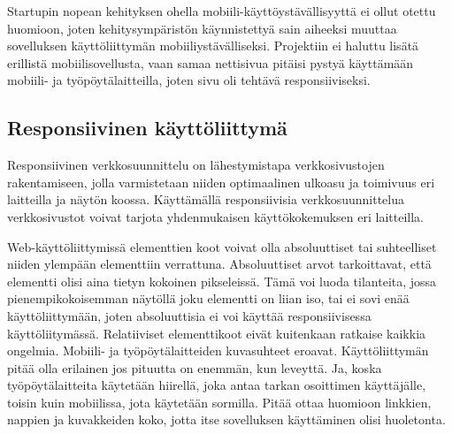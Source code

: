 

Startupin nopean kehityksen ohella mobiili-käyttöystävällisyyttä ei ollut otettu huomioon, 
joten kehitysympäristön käynnistettyä sain aiheeksi muuttaa sovelluksen käyttöliittymän mobiiliystävälliseksi.
Projektiin ei haluttu lisätä erillistä mobiilisovellusta, vaan samaa nettisivua pitäisi pystyä käyttämään mobiili- ja työpöytälaitteilla, joten sivu oli tehtävä responsiiviseksi.\medskip





\subsection*{Responsiivinen käyttöliittymä}




Responsiivinen verkkosuunnittelu on lähestymistapa verkkosivustojen rakentamiseen, jolla varmistetaan niiden optimaalinen ulkoasu ja toimivuus eri laitteilla ja näytön koossa.
Käyttämällä responsiivisia verkkosuunnittelua verkkosivustot voivat tarjota yhdenmukaisen käyttökokemuksen eri laitteilla.
\medskip


Web-käyttöliittymissä elementtien koot voivat olla absoluuttiset tai suhteelliset niiden ylempään elementtiin verrattuna. Absoluuttiset arvot tarkoittavat, että elementti olisi aina tietyn kokoinen pikseleissä. 
Tämä voi luoda tilanteita, jossa pienempikokoisemman näytöllä joku elementti on liian iso, tai ei sovi enää käyttöliittymään, joten absoluuttisia ei voi käyttää responsiivisessa käyttöliitymässä.
Relatiiviset elementtikoot eivät kuitenkaan ratkaise kaikkia ongelmia. Mobiili- ja työpöytälaitteiden kuvasuhteet eroavat. Käyttöliittymän pitää olla erilainen jos pituutta on enemmän, kun leveyttä. 
Ja, koska työpöytälaitteita käytetään hiirellä, joka antaa tarkan osoittimen käyttäjälle, toisin kuin mobiilissa, jota käytetään sormilla. 
Pitää ottaa huomioon linkkien, nappien ja kuvakkeiden koko, jotta itse sovelluksen käyttäminen olisi huoletonta.\medskip







